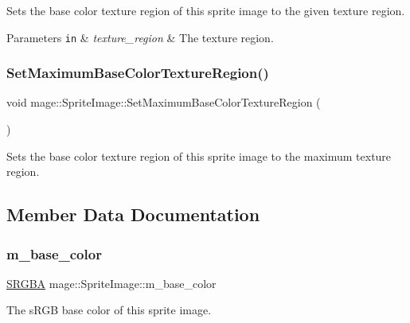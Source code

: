 Sets the base color texture region of this sprite image to the given texture region.


\begin{DoxyParams}[1]{Parameters}
\mbox{\tt in}  & {\em texture\+\_\+region} & The texture region. \\
\hline
\end{DoxyParams}
\hypertarget{classmage_1_1_sprite_image_aa08a58d1e94f8e26031b97b56b0c8c6a}{}\label{classmage_1_1_sprite_image_aa08a58d1e94f8e26031b97b56b0c8c6a} 
\subsubsection{\texorpdfstring{Set\+Maximum\+Base\+Color\+Texture\+Region()}{SetMaximumBaseColorTextureRegion()}}
{\footnotesize\ttfamily void mage\+::\+Sprite\+Image\+::\+Set\+Maximum\+Base\+Color\+Texture\+Region (\begin{DoxyParamCaption}{ }\end{DoxyParamCaption})\hspace{0.3cm}{\ttfamily [noexcept]}}

Sets the base color texture region of this sprite image to the maximum texture region. 

\subsection{Member Data Documentation}
\hypertarget{classmage_1_1_sprite_image_aa83cc38aa8a84e8fc434232b4223c236}{}\label{classmage_1_1_sprite_image_aa83cc38aa8a84e8fc434232b4223c236} 
\subsubsection{\texorpdfstring{m\+\_\+base\+\_\+color}{m\_base\_color}}
{\footnotesize\ttfamily \hyperlink{structmage_1_1_s_r_g_b_a}{S\+R\+G\+BA} mage\+::\+Sprite\+Image\+::m\+\_\+base\+\_\+color\hspace{0.3cm}{\ttfamily [private]}}

The s\+R\+GB base color of this sprite image. \hypertarget{classmage_1_1_sprite_image_a92f5b052561ca7d8fb317b8479d820a2}{}\label{classmage_1_1_sprite_image_a92f5b052561ca7d8fb317b8479d820a2} 
